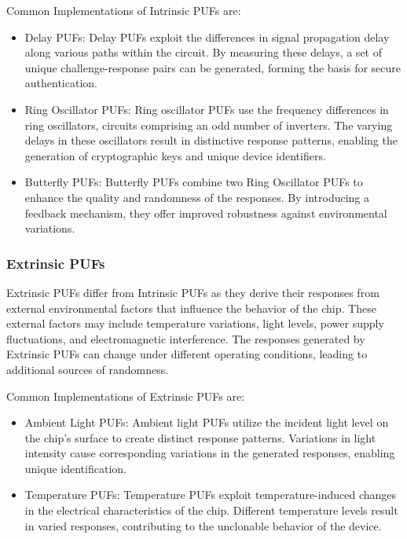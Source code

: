 \documentclass{article}
\begin{document}
Common Implementations of Intrinsic PUFs are:
\begin{itemize}
\item Delay PUFs: Delay PUFs exploit the differences in signal propagation delay along various paths within the circuit. By measuring these delays, a set of unique challenge-response pairs can be generated, forming the basis for secure authentication.

\item Ring Oscillator PUFs: Ring oscillator PUFs use the frequency differences in ring oscillators, circuits comprising an odd number of inverters. The varying delays in these oscillators result in distinctive response patterns, enabling the generation of cryptographic keys and unique device identifiers.

\item Butterfly PUFs: Butterfly PUFs combine two Ring Oscillator PUFs to enhance the quality and randomness of the responses. By introducing a feedback mechanism, they offer improved robustness against environmental variations.
\end{itemize}

\subsubsection{Extrinsic PUFs}

Extrinsic PUFs differ from Intrinsic PUFs as they derive their responses from external environmental factors that influence the behavior of the chip. These external factors may include temperature variations, light levels, power supply fluctuations, and electromagnetic interference. The responses generated by Extrinsic PUFs can change under different operating conditions, leading to additional sources of randomness.

Common Implementations of Extrinsic PUFs are:
\begin{itemize}
\item Ambient Light PUFs: Ambient light PUFs utilize the incident light level on the chip's surface to create distinct response patterns. Variations in light intensity cause corresponding variations in the generated responses, enabling unique identification.

\item Temperature PUFs: Temperature PUFs exploit temperature-induced changes in the electrical characteristics of the chip. Different temperature levels result in varied responses, contributing to the unclonable behavior of the device.
\end{itemize}
\end{document}
